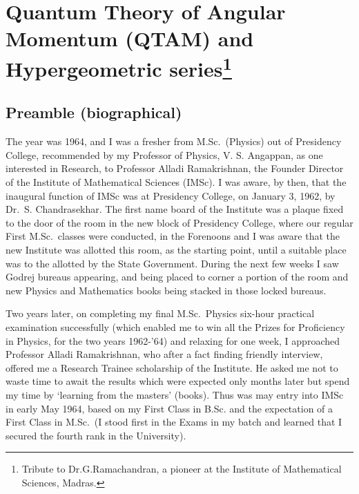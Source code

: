 \renewcommand{\thefootnote}{\arabic{footnote}}

\chapter[Quantum Theory of Angular Momentum and Hypergeometric series]{Quantum Theory of Angular Momentum (QTAM) and Hypergeometric series\footnote{Tribute to Dr.G.Ramachandran, a pioneer at the Institute of Mathematical Sciences, Madras.}}\label{chap29}



\section*{Preamble (biographical)}

The year was 1964, and I was a fresher from M.Sc.\ (Physics) out of Presidency College, recommended by my Professor of Physics, V. S. Angappan, as one interested in Research, to Professor Alladi Ramakrishnan, the Founder Director of the Institute of Mathematical Sciences (IMSc). I was aware, by then, that the inaugural function of IMSc was at Presidency College, on January 3, 1962, by Dr.\ S. Chandrasekhar. The first name board of the Institute was a plaque fixed to the door of the room in the new block of Presidency College, where our regular First M.Sc.\ classes were conducted, in the Forenoons and I was aware that the new Institute was allotted this room, as the starting point, until a suitable place was to the allotted by the State Government. During the next few weeks I saw Godrej bureaus appearing, and being placed to corner a portion of the room and new Physics and Mathematics books being stacked in those locked bureaus.

Two years later, on completing my final M.Sc.\ Physics six-hour practical examination successfully (which enabled me to win all the Prizes for Proficiency in Physics, for the two years 1962-'64) and relaxing for one week, I approached Professor Alladi Ramakrishnan, who after a fact finding friendly interview, offered me a Research Trainee scholarship of the Institute. He asked me not to waste time to await the results which were expected only months later but spend my time by `learning from the masters' (books). Thus was may entry into IMSc in early May 1964, based on my First Class in B.Sc. and the expectation of a First Class in M.Sc.\ (I stood first in the Exams in my batch and learned that I secured the fourth rank in the University).

